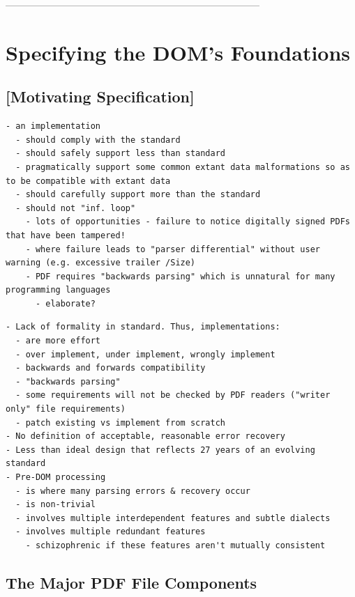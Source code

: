 ------------------------------------------------------------------------------
\section{Specifying the DOM's Foundations }
\label{sec:specifying}

\subsection{[Motivating Specification]}

\begin{lstlisting}[style=meta]
- an implementation
  - should comply with the standard
  - should safely support less than standard
  - pragmatically support some common extant data malformations so as to be compatible with extant data
  - should carefully support more than the standard
  - should not "inf. loop"
    - lots of opportunities - failure to notice digitally signed PDFs that have been tampered!
    - where failure leads to "parser differential" without user warning (e.g. excessive trailer /Size)
    - PDF requires "backwards parsing" which is unnatural for many programming languages
      - elaborate?
\end{lstlisting}

\begin{lstlisting}[style=meta]
- Lack of formality in standard. Thus, implementations:
  - are more effort
  - over implement, under implement, wrongly implement
  - backwards and forwards compatibility
  - "backwards parsing"
  - some requirements will not be checked by PDF readers ("writer only" file requirements) 
  - patch existing vs implement from scratch
- No definition of acceptable, reasonable error recovery
- Less than ideal design that reflects 27 years of an evolving standard
- Pre-DOM processing
  - is where many parsing errors & recovery occur
  - is non-trivial
  - involves multiple interdependent features and subtle dialects
  - involves multiple redundant features
    - schizophrenic if these features aren't mutually consistent
\end{lstlisting}

\subsection{The Major PDF File Components}

